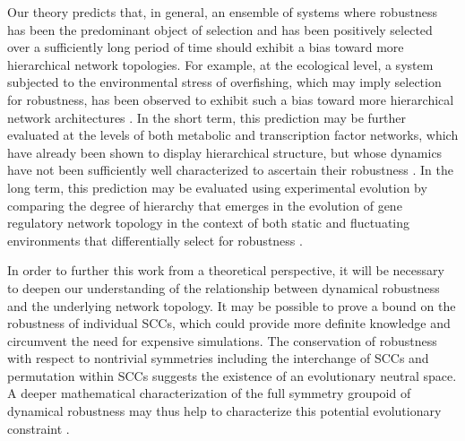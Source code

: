 Our theory predicts that, in general, an ensemble of systems where robustness has been the predominant object of selection and has been positively selected over a sufficiently long period of time should exhibit a bias toward more hierarchical network topologies. For example, at the ecological level, a system subjected to the environmental stress of overfishing, which may imply selection for robustness, has been observed to exhibit such a bias toward more hierarchical network architectures \cite{Bascompte2005}. In the short term, this prediction may be further evaluated at the levels of both metabolic and transcription factor networks, which have already been shown to display hierarchical structure, but whose dynamics have not been sufficiently well characterized to ascertain their robustness \cite{Zhao2006,Bhardwaj2010,Colm}.
In the long term, this prediction may be evaluated using experimental evolution by comparing the degree of hierarchy that emerges in the evolution of gene regulatory network topology in the context of both static and fluctuating environments that differentially select for robustness \cite{Leroi1994}.

In order to further this work from a theoretical perspective, it will be necessary to deepen our understanding of the relationship between dynamical robustness and the underlying network topology.
It may be possible to prove a bound on the robustness of individual SCCs, which could provide more definite knowledge and circumvent the need for expensive simulations. The conservation of robustness with respect to nontrivial symmetries including the interchange of SCCs and permutation within SCCs suggests the existence of an evolutionary neutral space. A deeper mathematical characterization of the full symmetry groupoid of dynamical robustness may thus help to characterize this potential evolutionary constraint \cite{Golubitsky2006}.


